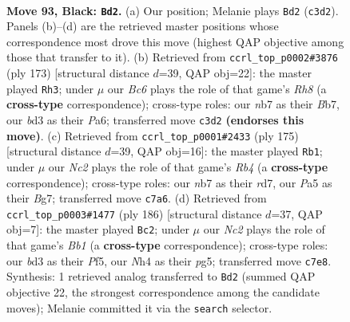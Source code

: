 \documentclass[11pt]{article}
\begin{document}
\clearpage

\begin{figure}[p]\centering
\begin{subfigure}{0.46\textwidth}\centering
\resizebox{\linewidth}{!}{%
\newchessgame
\chessboard[
  setfen={5k2/1Nn5/8/p7/P2pP2n/1PbB4/K3P2p/8 b - - 3 93},
  showmover=false,
  pgfstyle=straightmove, color=movearrow, markmove={c3-d2}
]}
\caption{}
\end{subfigure}\hfill
\begin{subfigure}{0.46\textwidth}\centering
\resizebox{\linewidth}{!}{%
\newchessgame
\chessboard[
  setfen={3k4/1b6/p5p1/P2P1pP1/1PP2B2/8/3KB3/7r b - - 18 87},
  showmover=false,
  pgfstyle=straightmove, color=movearrow, markmove={h1-h3}
]}
\caption{}
\end{subfigure}
\\[4pt]
\begin{subfigure}{0.46\textwidth}\centering
\resizebox{\linewidth}{!}{%
\newchessgame
\chessboard[
  setfen={6k1/3R2b1/6p1/1r3pPp/5P1P/4B3/5PK1/8 b - - 40 88},
  showmover=false,
  pgfstyle=straightmove, color=movearrow, markmove={b5-b1}
]}
\caption{}
\end{subfigure}\hfill
\begin{subfigure}{0.46\textwidth}\centering
\resizebox{\linewidth}{!}{%
\newchessgame
\chessboard[
  setfen={8/k7/3p1p2/3PbPp1/1P4P1/1K6/1p6/1B6 w - - 4 94},
  showmover=false,
  pgfstyle=straightmove, color=movearrow, markmove={b1-c2}
]}
\caption{}
\end{subfigure}
\caption{\textbf{Move 93, Black: \texttt{Bd2}.} (a) Our position; Melanie plays \texttt{Bd2} (\texttt{c3d2}). Panels (b)--(d) are the retrieved master positions whose correspondence most drove this move (highest QAP objective among those that transfer to it). (b) Retrieved from \texttt{ccrl\_top\_p0002\#3876} (ply 173) [structural distance $d$=39, QAP obj=22]: the master played \texttt{Rh3}; under $\mu$ our \emph{Bc6} plays the role of that game's \emph{Rh8} (a \textbf{cross-type} correspondence); cross-type roles: our \emph{n}b7 as their \emph{B}b7, our \emph{b}d3 as their \emph{P}a6; transferred move \texttt{c3d2} \textbf{(endorses this move)}. (c) Retrieved from \texttt{ccrl\_top\_p0001\#2433} (ply 175) [structural distance $d$=39, QAP obj=16]: the master played \texttt{Rb1}; under $\mu$ our \emph{Nc2} plays the role of that game's \emph{Rb4} (a \textbf{cross-type} correspondence); cross-type roles: our \emph{n}b7 as their \emph{r}d7, our \emph{P}a5 as their \emph{B}g7; transferred move \texttt{c7a6}. (d) Retrieved from \texttt{ccrl\_top\_p0003\#1477} (ply 186) [structural distance $d$=37, QAP obj=7]: the master played \texttt{Bc2}; under $\mu$ our \emph{Nc2} plays the role of that game's \emph{Bb1} (a \textbf{cross-type} correspondence); cross-type roles: our \emph{b}d3 as their \emph{P}f5, our \emph{N}h4 as their \emph{p}g5; transferred move \texttt{c7e8}. Synthesis: 1 retrieved analog transferred to \texttt{Bd2} (summed QAP objective 22, the strongest correspondence among the candidate moves); Melanie committed it via the \texttt{search} selector.}
\label{fig:thought-m185}
\end{figure}
\end{document}
